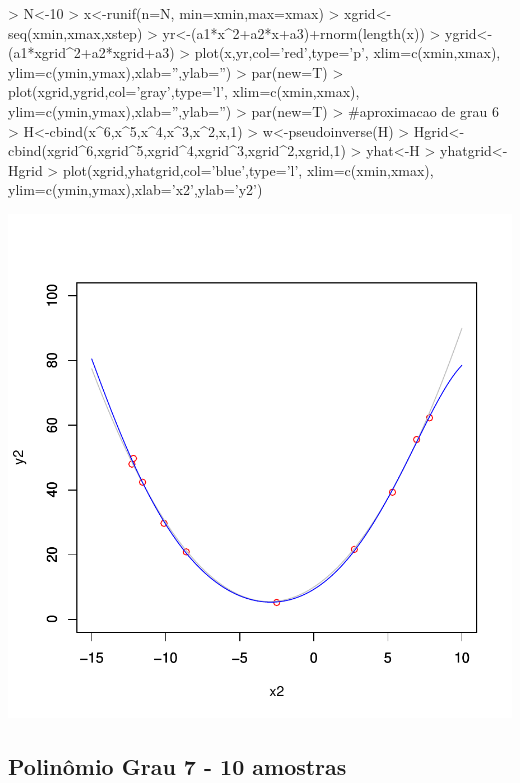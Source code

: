 \documentclass{article}
\begin{document}
\begin{Schunk}
\begin{Sinput}
>   N<-10
>   x<-runif(n=N, min=xmin,max=xmax)
>   xgrid<-seq(xmin,xmax,xstep)
>   yr<-(a1*x^2+a2*x+a3)+rnorm(length(x))
>   ygrid<-(a1*xgrid^2+a2*xgrid+a3)
>   plot(x,yr,col='red',type='p', xlim=c(xmin,xmax), ylim=c(ymin,ymax),xlab='',ylab='')
>   par(new=T)
>   plot(xgrid,ygrid,col='gray',type='l', xlim=c(xmin,xmax), ylim=c(ymin,ymax),xlab='',ylab='')
>   par(new=T)
>   #aproximacao de grau 6
>   H<-cbind(x^6,x^5,x^4,x^3,x^2,x,1)
>   w<-pseudoinverse(H) %
>   Hgrid<-cbind(xgrid^6,xgrid^5,xgrid^4,xgrid^3,xgrid^2,xgrid,1)
>   yhat<-H%
>   yhatgrid<-Hgrid%
>   plot(xgrid,yhatgrid,col='blue',type='l', xlim=c(xmin,xmax), ylim=c(ymin,ymax),xlab='x2',ylab='y2')
\end{Sinput}
\end{Schunk}
\includegraphics{aproximacao_polinomial-007}

\newpage
\subsection{Polinômio Grau 7 - 10 amostras}
\end{document}
